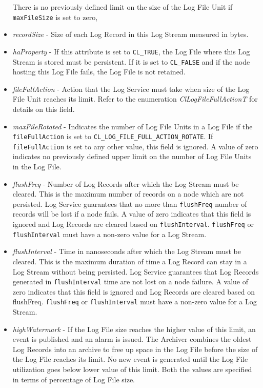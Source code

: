 \begin{flushleft}
\begin{itemize}
	There is no previously defined limit on the size of the Log File Unit if {\tt{maxFileSize}} is set to zero, 
	\item
	\textit{recordSize} - Size of each Log Record in this Log Stream measured in bytes.
	\item
	\textit{haProperty} - If this attribute is set to {\tt{CL\_\-TRUE}}, the Log File where this Log Stream is stored must be persistent.
	 If it is set to {\tt{CL\_\-FALSE}} and if the node hosting this Log File fails, the Log File is not retained.
	\item
	\textit{fileFullAction} - Action that the Log Service must take when size of the Log File Unit reaches its limit. Refer to the enumeration 
	\textit{ClLogFileFullActionT} for details on this field.
	\item
	\textit{maxFileRotated} - Indicates the number of Log File Units in a Log File if the {\tt{fileFullAction}} is set to 
	{\tt{CL\_\-LOG\_\-FILE\_\-FULL\_\-ACTION\_\-ROTATE}}. If {\tt{fileFullAction}} is set to any other value, this field is ignored. 
	A value of zero indicates no previously defined upper limit on the number of Log File Units in the Log File.
	\item
	\textit{flushFreq} - Number of Log Records after which the Log Stream must be cleared. This is the maximum number of records on a node which 
	are not persisted. Log Service guarantees that no more than {\tt{flushFreq}} number of records will be lost if a 
	node fails. A value of zero indicates that this field is ignored and Log Records are cleared based on {\tt{flushInterval}}.  
	{\tt{flushFreq}} or {\tt{flushInterval}} must have a non-zero value for a Log Stream.
\item
\textit{flushInterval} - Time in nanoseconds after which the Log Stream must be cleared. This is the maximum duration of time a Log Record can stay 
in a Log Stream without being persisted. Log Service guarantees that Log Records generated in {\tt{flushInterval}} time are not lost on a node failure. 
A value of zero indicates that this field is ignored and Log Records are cleared based on flushFreq. 
	{\tt{flushFreq}} or {\tt{flushInterval}} must have a non-zero value for a Log Stream.
\item
\textit{highWatermark} - If the Log File size reaches the higher value of this limit, an event is published and an alarm is issued. The Archiver 
combines the oldest Log Records into an archive to free up space in the Log File before the size of the Log File reaches its limit. No new event is 
generated until the Log File utilization goes below lower value of this limit. Both the values are specified in terms of percentage of Log File size.


\end{itemize}
\end{flushleft}
